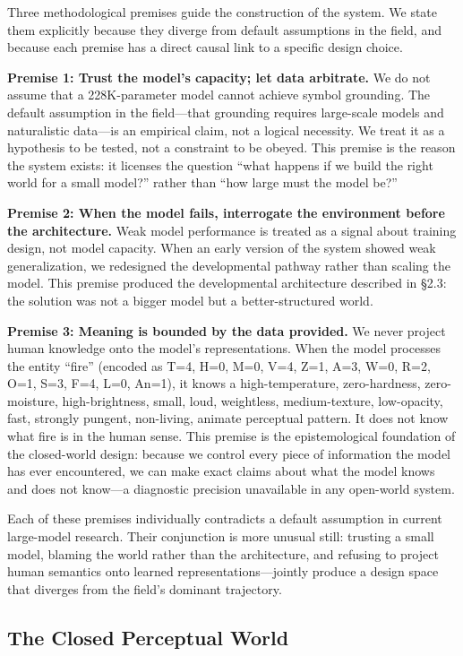 \documentclass{article}
\begin{document}
Three methodological premises guide the construction of the system. We state them explicitly because they diverge from default assumptions in the field, and because each premise has a direct causal link to a specific design choice.

\textbf{Premise 1: Trust the model's capacity; let data arbitrate.} We do not assume that a 228K-parameter model cannot achieve symbol grounding. The default assumption in the field---that grounding requires large-scale models and naturalistic data---is an empirical claim, not a logical necessity. We treat it as a hypothesis to be tested, not a constraint to be obeyed. This premise is the reason the system exists: it licenses the question ``what happens if we build the right world for a small model?'' rather than ``how large must the model be?''

\textbf{Premise 2: When the model fails, interrogate the environment before the architecture.} Weak model performance is treated as a signal about training design, not model capacity. When an early version of the system showed weak generalization, we redesigned the developmental pathway rather than scaling the model. This premise produced the developmental architecture described in \S2.3: the solution was not a bigger model but a better-structured world.

\textbf{Premise 3: Meaning is bounded by the data provided.} We never project human knowledge onto the model's representations. When the model processes the entity ``fire'' (encoded as T=4, H=0, M=0, V=4, Z=1, A=3, W=0, R=2, O=1, S=3, F=4, L=0, An=1), it knows a high-temperature, zero-hardness, zero-moisture, high-brightness, small, loud, weightless, medium-texture, low-opacity, fast, strongly pungent, non-living, animate perceptual pattern. It does not know what fire is in the human sense. This premise is the epistemological foundation of the closed-world design: because we control every piece of information the model has ever encountered, we can make exact claims about what the model knows and does not know---a diagnostic precision unavailable in any open-world system.

Each of these premises individually contradicts a default assumption in current large-model research. Their conjunction is more unusual still: trusting a small model, blaming the world rather than the architecture, and refusing to project human semantics onto learned representations---jointly produce a design space that diverges from the field's dominant trajectory.

\subsection{The Closed Perceptual World}
\end{document}
